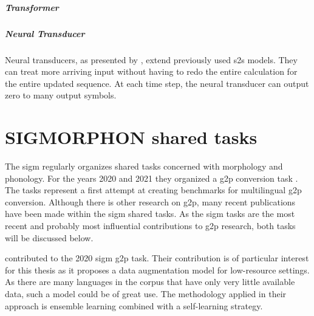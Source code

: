 \subparagraph{Transformer}

\subparagraph{Neural Transducer}
Neural transducers, as presented by \citet{jaitly2016neural}, extend previously used \ac{s2s} models. They can treat more arriving input without having to redo the entire calculation for the entire updated sequence. At each time step, the neural transducer can output zero to many output symbols. 


 



\section{SIGMORPHON shared tasks}
\label{section:sig}
The \ac{sigm} \citep{Sigmorphon.2021} regularly organizes shared tasks concerned with morphology and phonology. For the years 2020 and 2021 they organized a \ac{g2p} conversion task \citep{Ashby&Bartley.2021, gorman-etal-2020-sigmorphon}. The tasks represent a first attempt at creating benchmarks for multilingual \ac{g2p} conversion. Although there is other research on \ac{g2p}, many recent publications have been made within the \ac{sigm} shared tasks. As the \ac{sigm} tasks are the most recent and probably most influential contributions to \ac{g2p} research, both tasks will be discussed below. 

\citet{yu-etal-2020} contributed to the 2020 \ac{sigm} \ac{g2p} task. Their contribution is of particular interest for this thesis as it proposes a data augmentation model for low-resource settings. As there are many languages in the corpus that have only very little available data, such a model could be of great use. The methodology applied in their approach is ensemble learning combined with a self-learning strategy. 


